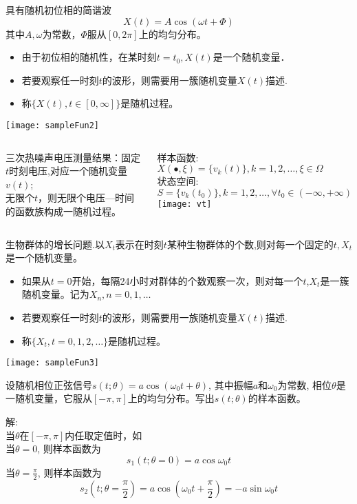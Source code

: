 \begin{frame}
\begin{example}
具有随机初位相的简谐波
\[X(t)=A\cos(\omega t+\Phi)\]
其中$A,\omega$为常数，$\Phi$服从$[0,2\pi]$上的均匀分布。
\begin{itemize}
	\item 由于初位相的随机性，在某时刻$t=t_0,X(t)$是一个随机变量．
	\item 若要观察任一时刻$t$的波形，则需要用一簇随机变量$X(t)$描述. 
	\item 称$\{X(t),t\in[0,\infty]\}$是随机过程。
\end{itemize}	
\end{example}
\texttt{[image: sampleFun2]}	
\end{frame}

\begin{frame}
\begin{columns}
\begin{example}
三次热噪声电压测量结果：固定$t$时刻电压,对应一个随机变量$v(t)$; \\
无限个$t$，则无限个电压---时间的函数族构成一随机过程。\\
\end{example}
样本函数: $X(\bullet,\xi)=\{v_k(t)\}, k=1,2,\dots, \xi\in \Omega$\\
状态空间: $S=\{v_k(t_0)\}, k=1,2,\dots, \forall t_0\in (-\infty, +\infty)$
\texttt{[image: vt]}
\end{columns}
\end{frame}

\begin{frame}
\begin{example}
生物群体的增长问题.以$X_t$表示在时刻$t$某种生物群体的个数,则对每一个固定的$t,X_t$是一个随机变量。　
\begin{itemize}
\item 如果从$t=0$开始，每隔24小时对群体的个数观察一次，则对每一个$t$,$X_t$是一簇随机变量。记为$X_n,n=0,1,\dots$
\item 若要观察任一时刻$t$的波形，则需要用一族随机变量$X(t)$描述. 
\item 称$\{X_t,t=0,1,2,\dots\}$是随机过程。
\end{itemize}	
\end{example}
\texttt{[image: sampleFun3]}	
\end{frame}

\begin{frame}
\begin{example}
	设随机相位正弦信号$s(t; \theta)=a\cos(\omega_0 t+\theta)$, 其中振幅$a$和$\omega_0$为常数, 相位$\theta$是一随机变量，它服从$[-\pi,\pi]$上的均匀分布。写出$s(t;\theta)$的样本函数。
\end{example}
解: \\
当$\theta$在$[-\pi,\pi]$内任取定值时，如\\
当$\theta=0$, 则样本函数为
$$s_1(t; \theta=0)=a\cos\omega_0t$$
当$\theta=\frac{\pi}{2}$, 则样本函数为
$$s_2(t; \theta=\frac{\pi}{2})=a\cos(\omega_0t+\frac{\pi}{2})=-a\sin\omega_0t$$
\end{frame}

